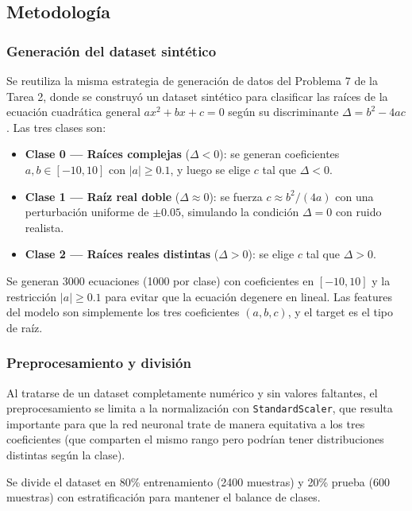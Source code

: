 \documentclass{article}
\begin{document}
\subsection{Metodología}

\subsubsection{Generación del dataset sintético}

Se reutiliza la misma estrategia de generación de datos del Problema 7 de la Tarea 2, donde se construyó un dataset sintético para clasificar las raíces de la ecuación cuadrática general $ax^2 + bx + c = 0$ según su discriminante $\Delta = b^2 - 4ac$. Las tres clases son:

\begin{itemize}
    \item \textbf{Clase 0 --- Raíces complejas} ($\Delta < 0$): se generan coeficientes $a, b \in [-10, 10]$ con $|a| \geq 0.1$, y luego se elige $c$ tal que $\Delta < 0$.
    \item \textbf{Clase 1 --- Raíz real doble} ($\Delta \approx 0$): se fuerza $c \approx b^2/(4a)$ con una perturbación uniforme de $\pm 0.05$, simulando la condición $\Delta = 0$ con ruido realista.
    \item \textbf{Clase 2 --- Raíces reales distintas} ($\Delta > 0$): se elige $c$ tal que $\Delta > 0$.
\end{itemize}

Se generan 3000 ecuaciones (1000 por clase) con coeficientes en $[-10, 10]$ y la restricción $|a| \geq 0.1$ para evitar que la ecuación degenere en lineal. Las features del modelo son simplemente los tres coeficientes $(a, b, c)$, y el target es el tipo de raíz.

\subsubsection{Preprocesamiento y división}

Al tratarse de un dataset completamente numérico y sin valores faltantes, el preprocesamiento se limita a la normalización con \texttt{StandardScaler}, que resulta importante para que la red neuronal trate de manera equitativa a los tres coeficientes (que comparten el mismo rango pero podrían tener distribuciones distintas según la clase).

Se divide el dataset en 80\% entrenamiento (2400 muestras) y 20\% prueba (600 muestras) con estratificación para mantener el balance de clases.
\end{document}
